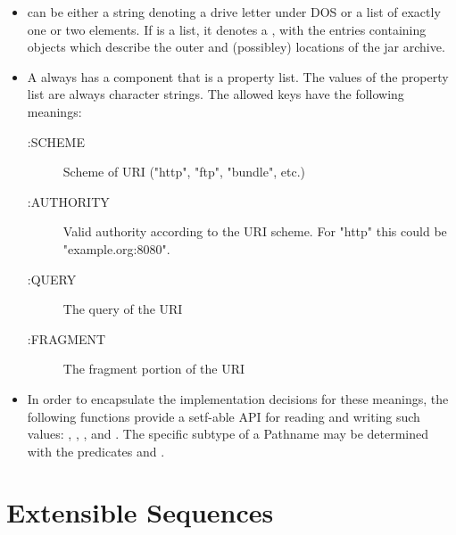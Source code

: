 \documentclass[10pt]{book}
\begin{document}
\begin{itemize}
\item {} can be either a string denoting a drive letter
  under DOS or a list of exactly one or two elements.  If
   is a list, it denotes a , with the entries
  containing  objects which describe the outer and (possibley)
  locations of the jar archive.

\item A  always has a  component that is a
  property list.  The values of the  property list are
  always character strings.  The allowed keys have the following meanings:
  \begin{description}
  \item[:SCHEME] Scheme of URI ("http", "ftp", "bundle", etc.)
  \item[:AUTHORITY] Valid authority according to the URI scheme.  For
    "http" this could be "example.org:8080". 
  \item[:QUERY] The query of the \textsc{URI} 
  \item[:FRAGMENT] The fragment portion of the \textsc{URI}
  \end{description}


\item In order to encapsulate the implementation decisions for these
  meanings, the following functions provide a setf-able API for
  reading and writing such values: ,
  , , and
  .  The specific subtype of a Pathname may
  be determined with the predicates  and
  .

\label{EXTENSIONS:URL-PATHNAME-SCHEME}

\label{EXTENSIONS:URL-PATHNAME-FRAGMENT}

\label{EXTENSIONS:URL-PATHNAME-AUTHORITY}

\label{EXTENSIONS:PATHNAME-URL-P}

\label{EXTENSIONS:URL-PATHNAME-QUERY}

\end{itemize}

         
\section{Extensible Sequences}
\end{document}
